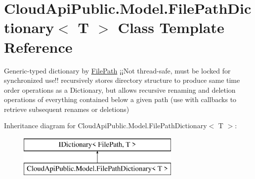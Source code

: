 \hypertarget{class_cloud_api_public_1_1_model_1_1_file_path_dictionary_3_01_t_01_4}{\section{Cloud\-Api\-Public.\-Model.\-File\-Path\-Dictionary$<$ T $>$ Class Template Reference}
\label{class_cloud_api_public_1_1_model_1_1_file_path_dictionary_3_01_t_01_4}
}


Generic-\/typed dictionary by \hyperlink{class_cloud_api_public_1_1_model_1_1_file_path}{File\-Path} ¡¡\-Not thread-\/safe, must be locked for synchronized use!! recursively stores directory structure to produce same time order operations as a Dictionary, but allows recursive renaming and deletion operations of everything contained below a given path (use with callbacks to retrieve subsequent renames or deletions)  


Inheritance diagram for Cloud\-Api\-Public.\-Model.\-File\-Path\-Dictionary$<$ T $>$\-:\begin{figure}[H]
\begin{center}
\leavevmode
\includegraphics[height=2.000000cm]{class_cloud_api_public_1_1_model_1_1_file_path_dictionary_3_01_t_01_4}
\end{center}
\end{figure}
